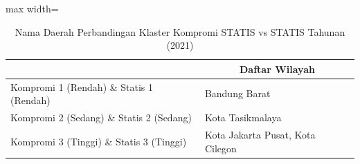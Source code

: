 \begin{table}[H]
\centering
\caption{Nama Daerah Perbandingan Klaster Kompromi STATIS vs STATIS Tahunan (2021)} \label{tab:sample2comp_statis_name_2021}
\begin{adjustbox}{max width=\textwidth}
\begin{tabular}{|>{\centering\arraybackslash}p{4cm}|p{10cm}|}
\hline
\multicolumn{1}{|c|}{\textbf{Kategori}} & \multicolumn{1}{c|}{\textbf{Daftar Wilayah}} \\
\hline
Kompromi 1 (Rendah) \& Statis 1 (Rendah) & Bandung Barat \\
\hline
Kompromi 2 (Sedang) \& Statis 2 (Sedang) & Kota Tasikmalaya \\
\hline
Kompromi 3 (Tinggi) \& Statis 3 (Tinggi) & Kota Jakarta Pusat, Kota Cilegon \\
\hline
\end{tabular}
\end{adjustbox}
\end{table}
